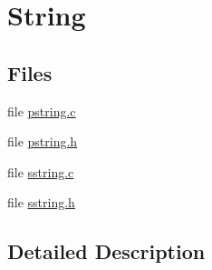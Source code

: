 \hypertarget{group__string}{\section{String}
\label{group__string}
}
\subsection*{Files}
\begin{DoxyCompactItemize}
\item 
file \hyperlink{pstring_8c}{pstring.\-c}
\item 
file \hyperlink{pstring_8h}{pstring.\-h}
\item 
file \hyperlink{sstring_8c}{sstring.\-c}
\item 
file \hyperlink{sstring_8h}{sstring.\-h}
\end{DoxyCompactItemize}


\subsection{Detailed Description}
